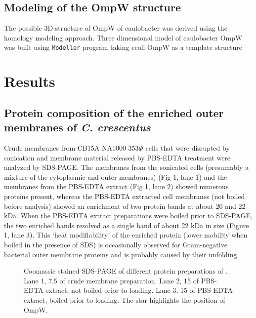 \subsection{Modeling of the OmpW structure}
\label{sub:porin_modeling}
The possible 3D-structure of OmpW of \ac{caulobacter} was derived using the homology modeling approach. Three dimensional model of \ac{caulobacter} OmpW was built using \texttt{Modeller} program taking \ac{ecoli} OmpW as a template structure
 
\section{Results}

\subsection{Protein composition of the enriched outer membranes of \textit{C. crescentus}}
Crude membranes from \caulobacter CB15A NA1000 353$\Phi$ cells that were disrupted by sonication and membrane material released by \ac{PBS}-\ac{EDTA} treatment were analyzed by \ac{SDS-PAGE}. The membranes from the sonicated cells (presumably a mixture of the cytoplasmic and outer membranes) (Fig 1, lane 1) and the membranes from the \ac{PBS}-\ac{EDTA} extract (Fig 1, lane 2) showed numerous proteins present, whereas the \ac{PBS}-\ac{EDTA} extracted cell membranes (not boiled before analysis) showed an enrichment of two protein bands at about 20 and 22 kDa. When the \ac{PBS}-\ac{EDTA} extract preparations were boiled prior to \ac{SDS-PAGE}, the two enriched bands resolved as a single band of about 22 kDa in size (Figure 1, lane 3). This `heat modifiability' of the enriched protein (\ie lower mobility when boiled in the presence of \textsc{SDS}) is occasionally observed for Gram-negative bacterial outer membrane proteins and is probably caused by their unfolding
\begin{figure}[H]
  	\begin{center}
   	\end{center}
   	\caption[Coomassie stained \ac{SDS-PAGE} of different protein preparations of \caulobacter.]{
	   	Coomassie stained \ac{SDS-PAGE} of different protein preparations of \caulobacter. 
Lane 1, 7.5 \microlitre of crude membrane preparation. Lane 2, 15 \microlitre of \ac{PBS}-\ac{EDTA} extract, not boiled prior to loading. Lane 3, 15 \microlitre of \ac{PBS}-\ac{EDTA} extract, boiled prior to loading. The star highlights the position of OmpW.
   	}
   	\label{fig:porin-pbsedtagel}
\end{figure}   
